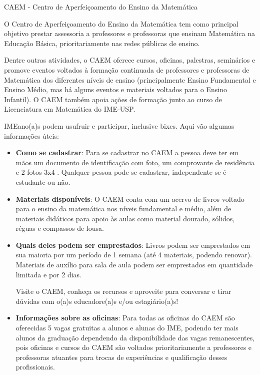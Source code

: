 \begin{secao}{CAEM - Centro de Aperfeiçoamento do Ensino da Matemática}

O Centro de Aperfeiçoamento do Ensino da Matemática tem como principal
objetivo prestar assessoria a professores e professoras que ensinam
Matemática na Educação Básica, prioritariamente nas redes públicas de
ensino.

Dentre outras atividades, o CAEM oferece cursos, oficinas, palestras,
seminários e promove eventos voltados à formação continuada de
professores e professoras de Matemática dos diferentes níveis de ensino
(principalmente Ensino Fundamental e Ensino Médio, mas há alguns eventos
e materiais voltados para o Ensino Infantil). O CAEM também apoia ações
de formação junto ao curso de Licenciatura em Matemática do IME-USP.

IMEano(a)s podem usufruir e participar, inclusive bixes. Aqui vão algumas
informações úteis:

\begin{itemize}

\item \textbf{Como se cadastrar}: Para se cadastrar no CAEM a pessoa
deve ter em mãos um documento de identificação com foto, um comprovante
de residência e 2 fotos 3x4 . Qualquer pessoa pode se cadastrar,
independente se é estudante ou não.

\item \textbf{Materiais disponíveis}: O CAEM conta com um acervo de
livros voltado para o ensino da matemática nos níveis fundamental e
médio, além de materiais didáticos para apoio às aulas como material
dourado, sólidos, réguas e compassos de lousa.

\item \textbf{Quais deles podem ser emprestados}: Livros podem ser
emprestados em sua maioria por um período de 1 semana (até 4 materiais,
podendo renovar). Materiais de auxílio para sala de aula podem ser
emprestados em quantidade limitada e por 2 dias.

  Visite o CAEM, conheça os recursos e aproveite para conversar e
  tirar dúvidas com o(a)s educadore(a)s e/ou estagiário(a)s!    

\item \textbf{Informações sobre as oficinas}: Para todas as oficinas do 
CAEM são oferecidas 5 vagas gratuitas a alunos e alunas do IME, podendo 
ter mais alunos da graduação dependendo da disponibilidade das vagas 
remanescentes, pois oficinas e cursos do CAEM são voltados prioritariamente 
a professores e professoras atuantes para trocas de experiências e 
qualificação desses profissionais.



\end{itemize}
\end{secao}
